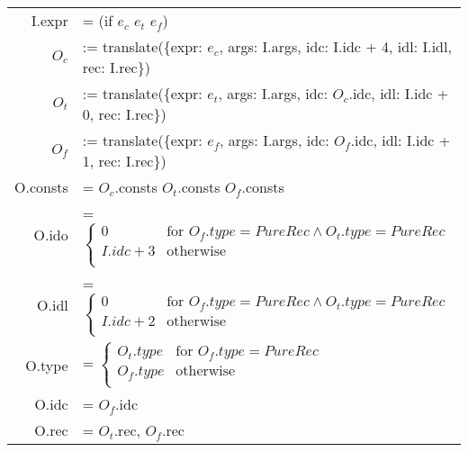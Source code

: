 \documentclass[letterpaper,12pt]{article}
\begin{document}
\medskip
\begin{tabularx}{\linewidth}{rl}
	I.expr &= (if $e_c$ $e_t$ $e_f$) \\
	$O_c$ &:= translate(\{expr: $e_c$, args: I.args, idc: I.idc + 4, idl: I.idl, rec: I.rec\}) \\
	$O_t$ &:= translate(\{expr: $e_t$, args: I.args, idc: $O_c$.idc, idl: I.idc + 0, rec: I.rec\}) \\
	$O_f$ &:= translate(\{expr: $e_f$, args: I.args, idc: $O_f$.idc, idl: I.idc + 1, rec: I.rec\}) \\

	O.consts &= $O_c$.consts $O_t$.consts $O_f$.consts \\
	O.ido &= 
	$\begin{cases}
		0 & \text{for } O_f.type = PureRec \land O_t.type = PureRec \\
		I.idc + 3 & \text{otherwise} \\
	\end{cases}$ \\

	O.idl &= 
	$\begin{cases}
		0 & \text{for } O_f.type = PureRec \land O_t.type = PureRec \\
		I.idc + 2 & \text{otherwise} \\
	\end{cases}$ \\

	O.type &= 
	$\begin{cases} 
		O_t.type & \text{for } O_f.type = PureRec \\
		O_f.type & \text{otherwise} \\
	\end{cases}$ \\
	O.idc &= $O_f$.idc \\
	O.rec &= $O_t$.rec, $O_f$.rec \\
\end{tabularx}
\end{document}
